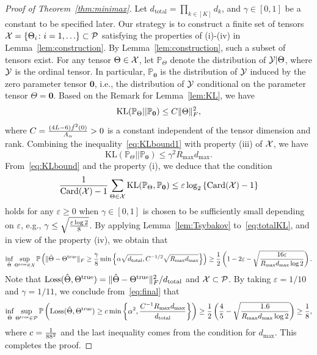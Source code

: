 \documentclass{article}
\theoremstyle{plain}
\theoremstyle{definition}
\begin{document}
\begin{proof}[Proof of Theorem~\ref{thm:minimax}]

Let $d_{\text{total}}=\prod_{k\in[K]}d_k$, and $\gamma\in[0,1]$ be a constant to be specified later.  Our strategy is to construct a finite set of tensors $\mathcal{X}=\{\Theta_i\colon i=1,\ldots \}\subset \mathcal{P}$ satisfying the properties of (i)-(iv) in Lemma~\ref{lem:construction}. By Lemma~\ref{lem:construction}, such a subset of tensors exist. For any tensor  $\Theta\in\mathcal{X}$, let $\mathbb{P}_{\Theta}$ denote the distribution of $\mathcal{Y}|\Theta$, where $\mathcal{Y}$ is the ordinal tensor. In particular, $\mathbb{P}_{\mathbf{0}}$ is the distribution of $\mathcal{Y}$ induced by the zero parameter tensor $\mathbf{0}$, i.e., the distribution of $\mathcal{Y}$ conditional on the parameter tensor $\Theta=\mathbf{0}$. Based on the Remark for Lemma~\ref{lem:KL}, we have
\begin{equation}\label{eq:KLbound1}
\mathrm{KL}(\mathbb{P}_{\Theta}|| \mathbb{P}_{\mathbf{0}})\leq C \lVert\Theta\rVert_F^2,
\end{equation}
where $C={(4L-6) \dot{f}^2(0)\over  A_\alpha}>0$ is a constant independent of the tensor dimension and rank.
Combining the inequality~\eqref{eq:KLbound1} with property (iii) of $\mathcal{X}$, we have
\begin{equation}\label{eq:KLbound}
\text{KL}(\mathbb{P}_{\Theta}||\mathbb{P}_{\mathbf{0}})\leq \gamma^2 R_{\max} d_{\max}.
\end{equation}
From~\eqref{eq:KLbound} and the property (i), we deduce that the condition
\begin{equation}\label{eq:totalKL}
{1\over \text{Card}(\mathcal{X})-1}\sum_{\Theta \in\mathcal{X}}\text{KL}(\mathbb{P}_{\Theta}, \mathbb{P}_{\mathbf{0}})\leq \varepsilon \log_2\left\{\text{Card}(\mathcal{X})-1 \right\}
\end{equation}
holds for any $ \varepsilon \geq 0$ when $\gamma\in[0,1]$ is chosen to be sufficiently small depending on $\varepsilon$, e.g., $\gamma \leq \sqrt{\varepsilon\log2\over8}$. By applying Lemma~\ref{lem:Tsybakov} to~\eqref{eq:totalKL}, and in view of the property (iv), we obtain that
\begin{equation}\label{eq:final}
\inf_{\hat \Theta}\sup_{\Theta^{\text{true}}\in \mathcal{X}}\mathbb{P}\left(\lVert\hat \Theta- \Theta^{\text{true}}\rVert_F\geq  {\gamma\over 8} \min\left\{ \alpha\sqrt{d_{\text{total}}}, C^{-1/2}\sqrt{ R_{\max}d_{\max}}\right\} \right)\geq {1\over 2}\left(1-2\varepsilon-\sqrt{16 \varepsilon \over R_{\max}d_{\max}\log2}\right).
\end{equation}
Note that $\text{Loss}(\hat \Theta, \Theta^{\text{true}})=\lVert\hat \Theta- \Theta^{\text{true}}\rVert_F^2/d_{\text{total}}$ and $\mathcal{X}\subset \mathcal{P}$. By taking $\varepsilon=1/10$ and $\gamma=1/11$, we conclude from~\eqref{eq:final} that
\begin{equation}\label{eq:prob}
\inf_{\hat \Theta}\sup_{\Theta^{\text{true}}\in \mathcal{P}}\mathbb{P}\left(\text{Loss}(\hat \Theta, \Theta^{\text{true}})\geq c\min\left \{ \alpha^2,  {C^{-1}R_{\max}d_{\max}\over d_{\text{total}}}\right \}\right)\geq {1\over 2}\left({4\over 5}- \sqrt{1.6\over R_{\max}d_{\max}\log2} \right)\geq {1\over 8},
\end{equation}
where $c = {1 \over 88^2}$ and the last inequality comes from the condition for $d_{\text{max}}$.
This completes the proof.
\end{proof}
\end{document}
